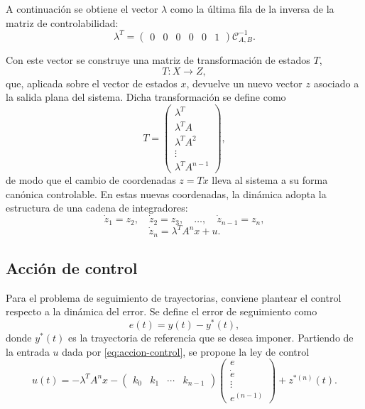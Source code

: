 \documentclass[conference]{IEEEtran}
\begin{document}
A continuación se obtiene el vector $\lambda$ como la última fila de la inversa de la matriz de controlabilidad:
\begin{equation}
	\lambda^T = \begin{pmatrix}
		0 & 0 & 0 & 0 & 0 & 1
	\end{pmatrix}
	\mathcal{C}^{-1}_{A,B}.
\end{equation}

Con este vector se construye una matriz de transformación de estados $T$,
\begin{equation}
	T : X \to Z,
\end{equation}
que, aplicada sobre el vector de estados $x$, devuelve un nuevo vector $z$ asociado a la salida plana del sistema. Dicha transformación se define como
\begin{equation}
	T =
	\begin{pmatrix}
		\lambda^T \\
		\lambda^T A \\
		\lambda^T A^2 \\
		\vdots \\
		\lambda^T A^{n-1}
	\end{pmatrix},
\end{equation}
de modo que el cambio de coordenadas $z = Tx$ lleva al sistema a su forma canónica controlable. En estas nuevas coordenadas, la dinámica adopta la estructura de una cadena de integradores:
\begin{equation}
	\dot{z}_1 = z_2, \quad
	\dot{z}_2 = z_3, \quad \dots, \quad
	\dot{z}_{n-1} = z_n,
\end{equation}
\begin{equation}
	\dot{z}_n = \lambda^T A^{n} x + u.
	\label{eq:accion-control}
\end{equation}

\subsection{Acción de control}
Para el problema de seguimiento de trayectorias, conviene plantear el control respecto a la dinámica del error. Se define el error de seguimiento como
\begin{equation}
	e(t) = y(t) - y^*(t),
\end{equation}
donde $y^*(t)$ es la trayectoria de referencia que se desea imponer. Partiendo de la entrada $u$ dada por \eqref{eq:accion-control}, se propone la ley de control
\begin{equation}
	u(t) = -\lambda^T A^{n} x
	- \begin{pmatrix}
		k_0 & k_1 & \cdots & k_{n-1}
	\end{pmatrix}
	\begin{pmatrix}
		e \\ \dot{e} \\ \vdots \\ e^{(n-1)}
	\end{pmatrix}
	+ z^{*(n)}(t).
\end{equation}
\end{document}
